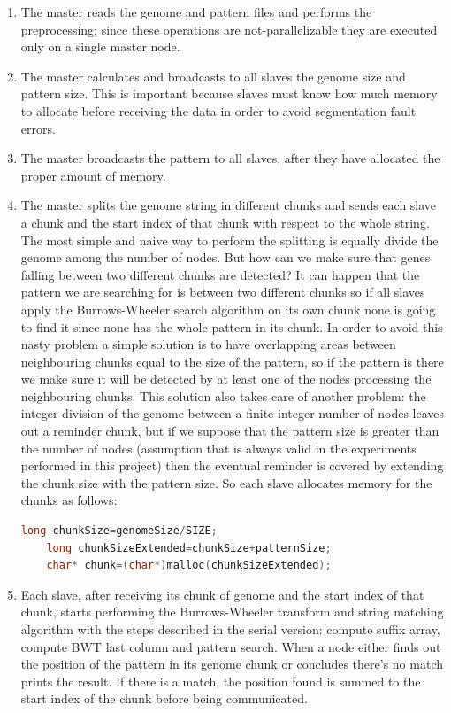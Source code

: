 \documentclass[final,5p,times,twocolumn,authoryear]{elsarticle}
\begin{document}
\begin{enumerate}
    \item The master reads the genome and pattern files and performs the preprocessing; since these operations are not-parallelizable they are executed only on a single master node.
    \item The master calculates and broadcasts to all slaves the genome size and pattern size. This is important because slaves must know how much memory to allocate before receiving the data in order to avoid segmentation fault errors.
    \item The master broadcasts the pattern to all slaves, after they have allocated the proper amount of memory.
    \item The master splits the genome string in different chunks and sends each slave a chunk and the start index of that chunk with respect to the whole string. The most simple and naive way to perform the splitting is equally divide the genome among the number of nodes. But how can we make sure that genes falling between two different chunks are detected? It can happen that the pattern we are searching for is between two different chunks so if all slaves apply the Burrows-Wheeler search algorithm on its own chunk none is going to find it since none has the whole pattern in its chunk. In order to avoid this nasty problem a simple solution is to have overlapping areas between neighbouring chunks equal to the size of the pattern, so if the pattern is there we make sure it will be detected by at least one of the nodes processing the neighbouring chunks. This solution also takes care of another problem: the integer division of the genome between a finite integer number of nodes leaves out a reminder chunk, but if we suppose that the pattern size is greater than the number of nodes (assumption that is always valid in the experiments performed in this project) then the eventual reminder is covered by extending the chunk size with the pattern size. So each slave allocates memory for the chunks as follows:
    \begin{lstlisting}[language=c++]
    long chunkSize=genomeSize/SIZE;
    long chunkSizeExtended=chunkSize+patternSize;
    char* chunk=(char*)malloc(chunkSizeExtended);
    \end{lstlisting}
    \item Each slave, after receiving its chunk of genome and the start index of that chunk, starts performing the Burrows-Wheeler transform and string matching algorithm with the steps described in the serial version: compute suffix array, compute BWT last column and pattern search. When a node either finds out the position of the pattern in its genome chunk or concludes there's no match prints the result. If there is a match, the position found is summed to the start index of the chunk before being communicated.
\end{enumerate}
\end{document}
